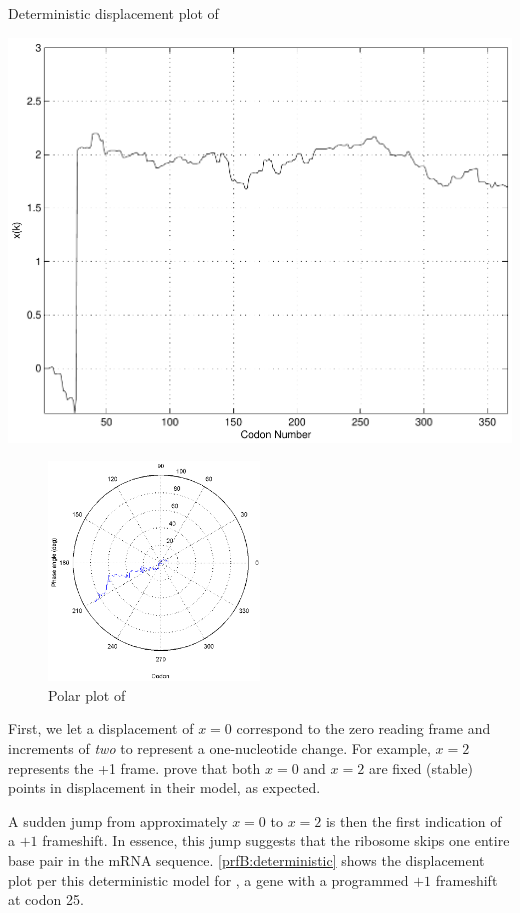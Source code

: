 \documentclass[12pt]{article}
\numberwithin{equation}{section}
\begin{document}
\begin{cfigure}
  \caption{Deterministic displacement plot of~\prfB}
  \label{prfB:deterministic}
  \includegraphics[scale=0.4]{prfB/deterministic}
\end{cfigure}

\begin{figure}
  \caption{Polar plot of \prfB}
  \label{prfB:polar}
  \includegraphics[width=0.5\textwidth]{prfB/polar}
\end{figure}

First, we let a displacement of $x = 0$ correspond to the zero reading frame and increments of
\emph{two} to represent a one-nucleotide change. For example, $x =2$ represents the +1 frame.
\citet{lalit:embs} prove that both $x = 0$ and $x = 2$ are fixed (stable) points in displacement in their model,
as expected.

A sudden jump from approximately $x = 0$ to $x = 2$ is then the first indication of a $+1$ frameshift.
In essence, this jump suggests that the ribosome skips one entire base pair in the mRNA sequence.
\autoref{prfB:deterministic} shows the displacement plot per this deterministic model for \prfB, 
a gene with a programmed $+1$ frameshift at codon 25.
\end{document}
